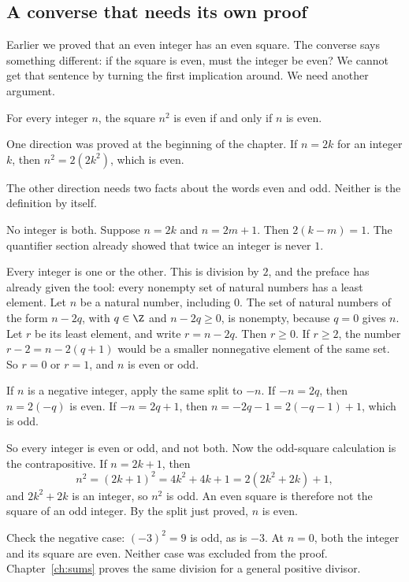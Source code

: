 \subsection*{A converse that needs its own proof}

Earlier we proved that an even integer has an even square. The converse says
something different: if the square is even, must the integer be even?
We cannot get that sentence by turning the first implication around. We need
another argument.

\begin{examplex}\label{ex:parity-square}
For every integer $n$, the square $n^2$ is even if and only if $n$ is even.

One direction was proved at the beginning of the chapter. If $n=2k$ for
an integer $k$, then $n^2=2(2k^2)$, which is even.

The other direction needs two facts about the words even and odd. Neither
is the definition by itself.

No integer is both. Suppose $n=2k$ and $n=2m+1$. Then $2(k-m)=1$. The
quantifier section already showed that twice an integer is never $1$.

Every integer is one or the other. This is division by $2$, and the preface
has already given the tool: every nonempty set of natural numbers has a
least element. Let $n$ be a natural number, including $0$. The set of
natural numbers of the form $n-2q$, with $q\in\Z$ and $n-2q\ge 0$, is
nonempty, because $q=0$ gives $n$. Let $r$ be its least element, and write
$r=n-2q$. Then $r\ge 0$. If $r\ge 2$, the number $r-2=n-2(q+1)$ would be a
smaller nonnegative element of the same set. So $r=0$ or $r=1$, and $n$ is
even or odd.

If $n$ is a negative integer, apply the same split to $-n$. If $-n=2q$,
then $n=2(-q)$ is even. If $-n=2q+1$, then
$n=-2q-1=2(-q-1)+1$, which is odd.

So every integer is even or odd, and not both. Now the odd-square
calculation is the contrapositive. If $n=2k+1$, then
\[
n^2=(2k+1)^2=4k^2+4k+1=2(2k^2+2k)+1,
\]
and $2k^2+2k$ is an integer, so $n^2$ is odd. An even square is therefore
not the square of an odd integer. By the split just proved, $n$ is even.

Check the negative case: $(-3)^2=9$ is odd, as is $-3$.
At $n=0$, both the integer and its square are even. Neither case was
excluded from the proof. Chapter~\ref{ch:sums} proves the same division
for a general positive divisor.
\end{examplex}

